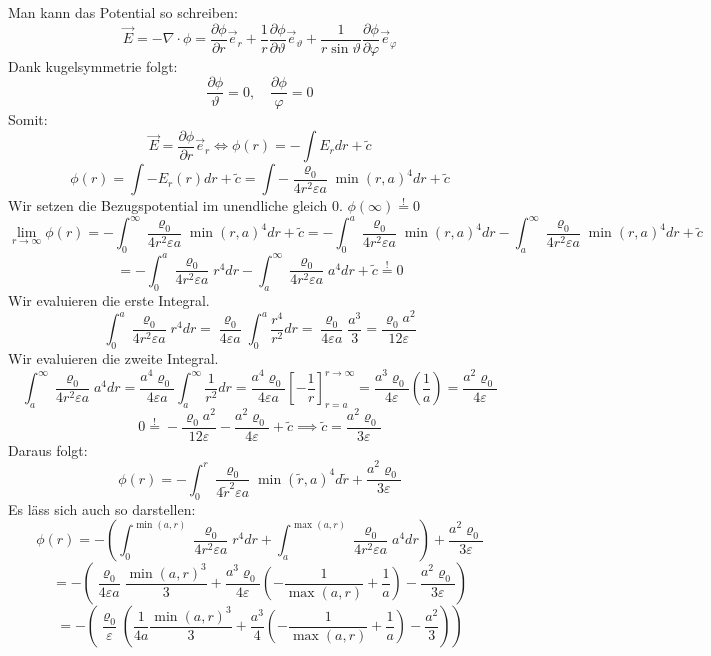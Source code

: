 \documentclass{scrartcl}
\let\*\cdot
\let\>\Leftrightarrow
\begin{document}
\begin{itemize}
     Man kann das Potential so schreiben:
     \[\vec{E}=- \nabla \* \phi=\frac{\partial \phi}{\partial r}\vec{e}_r+\frac{1}{r}\frac{\partial \phi}{\partial \vartheta}\vec{e}_\vartheta+\frac{1}{r \sin{\vartheta}}\frac{\partial \phi}{\partial \varphi}\vec{e}_\varphi\]
     Dank kugelsymmetrie folgt:
     \[\frac{\partial \phi}{\vartheta}=0,\quad\frac{\partial \phi}{\varphi}=0\]
Somit:
\[\vec{E}=\frac{\partial \phi}{\partial r}\vec{e}_r \> \phi(r) = -\int E_r d r +\tilde{c}\]
\[\phi(r)=\int -E_r(r) dr+\tilde{c}=\int -\frac{\varrho_0}{4 r^2 \varepsilon a} {\min(r,a)}^4  dr  +\tilde{c}\]
Wir setzen die Bezugspotential im unendliche gleich $0$. \(\phi(\infty)\overset{!}{=}0\)
\[\lim_{r\rightarrow\infty}\phi(r)=-\int_0^\infty \frac{\varrho_0}{4 r^2 \varepsilon a} {\min(r,a)}^4  dr  +\tilde{c}
=-\int_0^a \frac{\varrho_0}{4 r^2 \varepsilon a} {\min(r,a)}^4  dr -\int_a^\infty \frac{\varrho_0}{4 r^2 \varepsilon a} {\min(r,a)}^4  dr  +\tilde{c} \]
\[=-\int_0^a \frac{\varrho_0}{4 r^2 \varepsilon a} {r}^4  dr -\int_a^\infty \frac{\varrho_0}{4 r^2 \varepsilon a} {a}^4  dr  +\tilde{c} \overset{!}{=}0\]
Wir evaluieren die erste Integral.
\[\int_0^a \frac{\varrho_0}{4 r^2 \varepsilon a} {r}^4  dr=\frac{\varrho_0}{4 \varepsilon a}\int_0^a \frac{r^4}{r^2} dr=\frac{\varrho_0}{4 \varepsilon a} \frac{a^3}{3}=\frac{\varrho_0 a^2}{12 \varepsilon }\]
Wir evaluieren die zweite Integral.
\[\int_a^\infty \frac{\varrho_0}{4 r^2 \varepsilon a} {a}^4  dr=\frac{a^4 \varrho_0}{4\varepsilon a}\int_a^\infty \frac{1}{r^2} dr
=\frac{a^4 \varrho_0}{4\varepsilon a}\left[-\frac{1}{r}\right]_{r=a}^{r\rightarrow\infty}
=\frac{a^3 \varrho_0}{4\varepsilon}\left(\frac{1}{a}\right)
=\frac{a^2 \varrho_0}{4\varepsilon}\]
\[0\overset{!}{=}-\frac{\varrho_0 a^2}{12 \varepsilon }-\frac{a^2 \varrho_0}{4\varepsilon}+\tilde{c}\implies\tilde{c}=\frac{a^2 \varrho_0}{3\varepsilon}\] 
Daraus folgt:
\[\phi(r)=-\int_0^r \frac{\varrho_0}{4 \tilde{r}^2 \varepsilon a} {\min(\tilde{r},a)}^4  d\tilde{r}  +\frac{a^2 \varrho_0}{3\varepsilon}\]
Es läss sich auch so darstellen:
\[\phi(r)=-\left(\int_0^{\min(a,r)} \frac{\varrho_0}{4 r^2 \varepsilon a} {r}^4  dr+\int_a^{\max(a,r)} \frac{\varrho_0}{4 r^2 \varepsilon a} {a}^4 dr\right)  +\frac{a^2 \varrho_0}{3\varepsilon}\]
\[=-\left(\frac{\varrho_0}{4 \varepsilon a} \frac{{\min(a,r)}^3}{3}+
\frac{a^3 \varrho_0}{4\varepsilon}\left(-\frac{1}{\max(a,r)}+\frac{1}{a}\right)-\frac{a^2 \varrho_0}{3\varepsilon}\right)\]
\[=-\left(\frac{\varrho_0}{\varepsilon}\left(\frac{1}{4 a} \frac{{\min(a,r)}^3}{3}+
\frac{a^3}{4}\left(-\frac{1}{\max(a,r)}+\frac{1}{a}\right)-\frac{a^2}{3}\right)\right)\]

\end{itemize}
\end{document}
